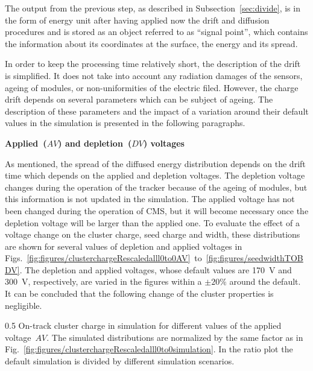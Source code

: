 The output from the previous step, as described in Subsection~\ref{sec:divide}, is in the form of energy unit after having applied now the drift and diffusion procedures and is stored as an object referred to as ``signal point'', which contains the information about its coordinates at the surface, the energy and its spread.

In order to keep the processing time relatively short, the description of the drift is simplified. It does not take into account any radiation damages of the sensors, ageing of modules, or non-uniformities of the electric filed. However, the charge drift depends on several parameters which can be subject of ageing. The description of these parameters and the impact of a variation around their default values in the  simulation is presented in the following paragraphs. 

\textbf{Applied~($AV$) and depletion~($DV$) voltages}

As mentioned, the spread of the diffused energy distribution depends on the drift time which depends on the applied and depletion voltages. The depletion voltage changes during the operation of the tracker because of the ageing of modules, but this information is not updated in the simulation. The applied voltage has not been changed during the operation of CMS, but it will become necessary once the depletion voltage will be larger than the applied one. To evaluate the effect of a voltage change on the cluster charge, seed charge and width, these distributions are shown for several values of depletion and applied voltages in Figs.~\ref{fig:figures/clusterchargeRescaledalll0to0AV}~to~\ref{fig:figures/seedwidthTOBDV}. The depletion and applied voltages, whose default values are 170~V and  300~V, respectively, are varied in the figures within a $\pm 20\%$ around the default. It can be concluded that the following change of the cluster properties is negligible.


                 {0.5}       %
                 { On-track cluster charge in simulation for different values of the applied voltage~$AV$.  The simulated distributions are normalized by the same factor as in Fig.~\ref{fig:figures/clusterchargeRescaledalll0to0simulation}. In the ratio plot the default simulation is divided by different simulation scenarios. }

